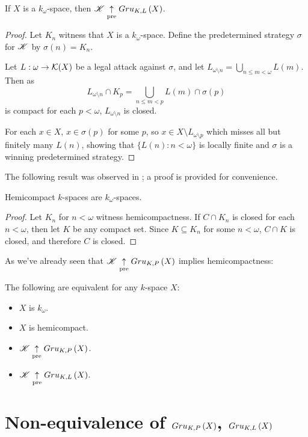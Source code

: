 \begin{thm}
  If $X$ is a $k_\omega$-space, then
  $\mathscr{K} \underset{\text{pre}}{\uparrow} Gru_{K,L}\left({X}\right)$.
\end{thm}

\begin{proof}
  Let $K_n$ witness that $X$ is a $k_\omega$-space. Define the predetermined
  strategy $\sigma$ for $\mathscr{K}$ by $\sigma(n)=K_n$.

  Let $L:\omega\to\mathcal{K}(X)$ be a legal attack against $\sigma$, and let
  $L_{\omega\setminus n} = \bigcup_{n\leq m<\omega}L(m)$. Then as
    \[
      L_{\omega\setminus n}\cap K_p
        =
      \bigcup_{n\leq m< p}L(m) \cap \sigma(p)
    \]
  is compact for each $p<\omega$, $L_{\omega\setminus n}$ is closed.

  For each $x\in X$, $x\in \sigma(p)$ for some $p$, so
  $x\in X\setminus L_{\omega\setminus p}$ which misses all but finitely
  many $L(n)$, showing that $\{L(n):n<\omega\}$ is locally finite and
  $\sigma$ is a winning predetermined strategy.
\end{proof}

The following result was observed in \cite{MR540599}; a proof is provided
for convenience.

\begin{prop}
  Hemicompact $k$-spaces are $k_\omega$-spaces.
\end{prop}

\begin{proof}
  Let $K_n$ for $n<\omega$ witness hemicompactness.
  If $C\cap K_n$ is closed for each $n<\omega$, then let $K$ be any compact
  set. Since $K\subseteq K_n$ for some $n<\omega$, $C\cap K$ is closed, and
  therefore $C$ is closed.
\end{proof}

As we've already seen that $\mathscr{K} \underset{\text{pre}}{\uparrow} Gru_{K,P}\left({X}\right)$ implies
hemicompactness:

\begin{cor}
  The following are equivalent for any $k$-space $X$:
    \begin{itemize}
      \item $X$ is $k_{\omega}$.
      \item $X$ is hemicompact.
      \item $\mathscr{K} \underset{\text{pre}}{\uparrow} Gru_{K,P}\left({X}\right)$.
      \item $\mathscr{K} \underset{\text{pre}}{\uparrow} Gru_{K,L}\left({X}\right)$.
    \end{itemize}
\end{cor}

\section{Non-equivalence of $Gru_{K,P}\left({X}\right)$, $Gru_{K,L}\left({X}\right)$}

